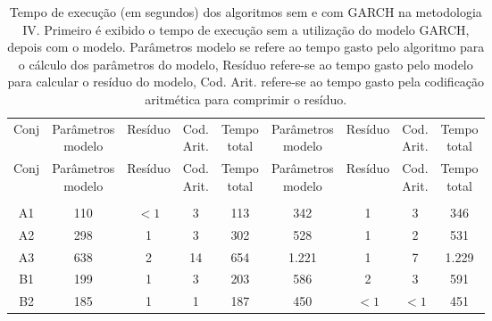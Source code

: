 \begin{center}
\begin{longtable}{ccccc|cccc}
\toprule
\rowcolor{white}
\caption[Metodologia IV: tempo de execução]{Tempo de execução (em segundos)
dos algoritmos sem e com GARCH na metodologia IV. Primeiro é exibido o tempo de
execução sem a utilização do modelo GARCH, depois com o modelo. Parâmetros
modelo se refere ao tempo gasto pelo algoritmo para o cálculo dos parâmetros do
modelo, Resíduo refere-se ao tempo gasto pelo modelo para calcular o resíduo do
modelo, Cod. Arit. refere-se ao tempo gasto pela codificação aritmética para
comprimir o resíduo.} \label{tab:EvolucaoEntropiaMet4}\\
\midrule
Conj & \specialcell{Parâmetros\\modelo} &
Resíduo & \specialcell{Cod.\\Arit.} & \specialcell{Tempo\\total} &
\specialcell{Parâmetros\\modelo} &
Resíduo & \specialcell{Cod.\\Arit.} & \specialcell{Tempo\\total} \\
\midrule
\endfirsthead 
\midrule
\rowcolor{white}
Conj & \specialcell{Parâmetros\\modelo} &
Resíduo & \specialcell{Cod.\\Arit.} & \specialcell{Tempo\\total} &
\specialcell{Parâmetros\\modelo} &
Resíduo & \specialcell{Cod.\\Arit.} & \specialcell{Tempo\\total} \\
\toprule
\endhead
\midrule \\ %
\endfoot
\bottomrule 
\endlastfoot
    A1    & 110   & $<1$     & 3     & 113   & 342   & 1     & 3     & 346 \\
    A2    & 298   & 1     & 3     & 302   & 528   & 1     & 2     & 531 \\
    A3    & 638   & 2     & 14    & 654   & 1.221 & 1     & 7     & 1.229 \\
    B1    & 199   & 1     & 3     & 203   & 586   & 2     & 3     & 591 \\
    B2    & 185   & 1     & 1     & 187   & 450   & $<1$     & $<1$     & 451 \\

\end{longtable}
\end{center}
